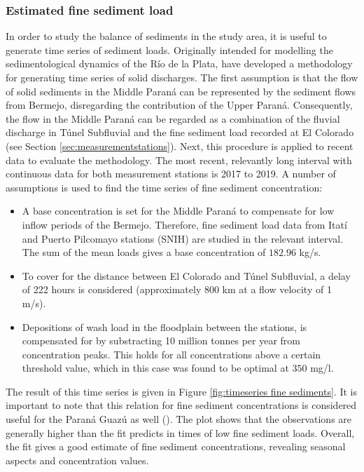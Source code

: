 \subsubsection{Estimated fine sediment load}
In order to study the balance of sediments in the study area, it is useful to generate time series of sediment loads. Originally intended for modelling the sedimentological dynamics of the Río de la Plata, \citeauthor{reMetodologiaParaGeneracion2009} have developed a methodology for generating time series of solid discharges. The first assumption is that the flow of solid sediments in the Middle Paraná can be represented by the sediment flows from Bermejo, disregarding the contribution of the Upper Paraná. Consequently, the flow in the Middle Paraná can be regarded as a combination of the fluvial discharge in Túnel Subfluvial and the fine sediment load recorded at El Colorado (see Section \ref{sec:measurementstations}). Next, this procedure is applied to recent data to evaluate the methodology. The most recent, relevantly long interval with continuous data for both measurement stations is 2017 to 2019. A number of assumptions is used to find the time series of fine sediment concentration:

\begin{itemize}
    \item A base concentration is set for the Middle Paraná to compensate for low inflow periods of the Bermejo. Therefore, fine sediment load data from Itatí and Puerto Pilcomayo stations (SNIH) are studied in the relevant interval. The sum of the mean loads gives a base concentration of $182.96$ kg/s.
    \item To cover for the distance between El Colorado and Túnel Subfluvial, a delay of 222 hours is considered (approximately 800 km at a flow velocity of 1 m/s). 
    \item Depositions of wash load in the floodplain between the stations, is compensated for by substracting 10 million tonnes per year from concentration peaks. This holds for all concentrations above a certain threshold value, which in this case was found to be optimal at $350$ mg/l.
\end{itemize}

The result of this time series is given in Figure \ref{fig:timeseries fine sediments}. It is important to note that this relation for fine sediment concentrations is considered useful for the Paraná Guazú as well (\cite{reMetodologiaParaGeneracion2009}). The plot shows that the observations are generally higher than the fit predicts in times of low fine sediment loads. Overall, the fit gives a good estimate of fine sediment concentrations, revealing seasonal aspects and concentration values.

